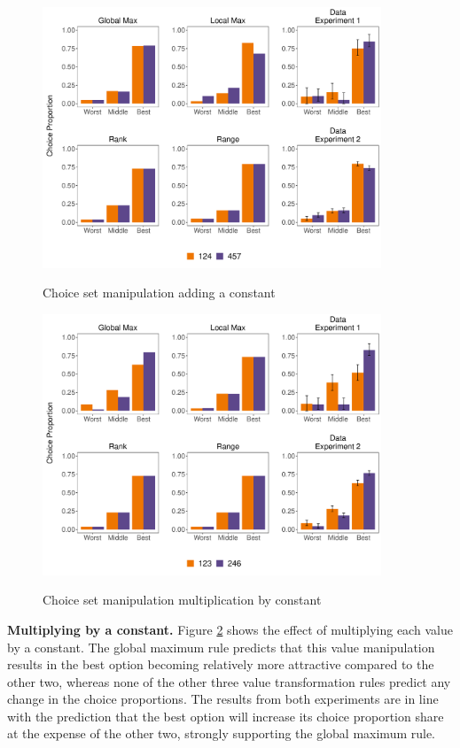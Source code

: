 \documentclass[11pt,a4paper]{article}
\begin{document}
\begin{figure}[!htb]
\captionsetup{justification=centering}
\centering
\caption{Choice set manipulation adding a constant}
\includegraphics[width=0.9\textwidth]{./addconst.pdf}
\label{fig:addconstant_all}
\end{figure}

\begin{figure}[!htb]
\captionsetup{justification=centering}
\centering
\caption{Choice set manipulation multiplication by constant}
\includegraphics[width=0.9\textwidth]{./multiply.pdf}
\label{fig:multiply_all}
\end{figure}


\textbf{Multiplying by a constant.} Figure \ref{fig:multiply_all} shows the effect of multiplying each value by a constant. The global maximum rule predicts that this value manipulation results in the best option becoming relatively more attractive compared to the other two, whereas none of the other three value transformation rules predict any change in the choice proportions. The results from both experiments are in line with the prediction that the best option will increase its choice proportion share at the expense of the other two, strongly supporting the global maximum rule.
\end{document}
